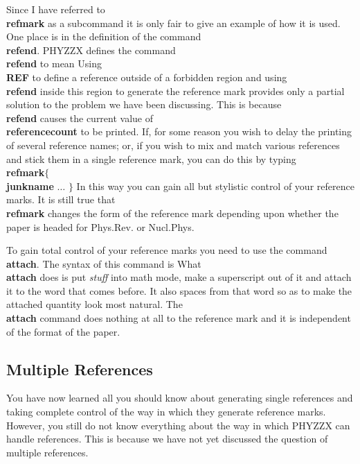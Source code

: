 Since I have referred to {\bf \\refmark} as a subcommand
it is only fair to give an example of how it is used.
One place is in the definition of the command {\bf \\refend}.
PHYZZX defines the command {\bf \\refend} to mean
Using {\bf \\REF} to define a reference outside
of a forbidden region and using {\bf \\refend} inside this region
to generate the reference mark provides only a partial solution to the
problem we have been discussing.
This is because {\bf \\refend} causes the current value
of {\bf \\referencecount} to be printed.
If, for some reason you wish to delay the printing of
several reference names; or, if you wish to mix and match various
references and stick them in a single reference mark, you can
do this by typing {\bf \\refmark$\{$ \\junkname} $\ldots$ {\bf $\}$}
In this way you can gain all but stylistic control
of your reference marks.
It is still true that {\bf \\refmark} changes the form of the
reference mark depending upon whether the paper is headed for
Phys.Rev. or Nucl.Phys.
 
To gain total control of your reference marks
you need to use the command {\bf \\attach}.
The syntax of this command is
What {\bf \\attach} does is put {\it stuff} into math mode,
make a superscript out of it and attach it to the word that
comes before.
It also spaces from that word so as to make the attached
quantity look most natural.
The {\bf \\attach} command does nothing at all to the reference
mark and it is independent of the format of the paper.
 
\subsection{Multiple References}
 
You have now learned all you should know about generating
single references and taking complete control of the way in which
they generate reference marks.
However, you still do not know everything about the
way in which PHYZZX can handle references.
This is because we have not yet discussed the question of
multiple references.
 
